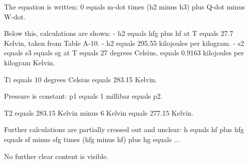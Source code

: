 The equation is written:  
0 equals m-dot times (h2 minus h3) plus Q-dot minus W-dot.  

Below this, calculations are shown:  
- h2 equals hfg plus hf at T equals 27.7 Kelvin, taken from Table A-10.  
- h2 equals 295.55 kilojoules per kilogram.  
- s2 equals s3 equals sg at T equals 27 degrees Celsius, equals 0.9163 kilojoules per kilogram Kelvin.  

Ti equals 10 degrees Celsius equals 283.15 Kelvin.  

Pressure is constant:  
p1 equals 1 millibar equals p2.  

T2 equals 283.15 Kelvin minus 6 Kelvin equals 277.15 Kelvin.  

Further calculations are partially crossed out and unclear:  
h equals hf plus hfg equals sf minus sfg times (hfg minus hf) plus hg equals ...  

No further clear content is visible.